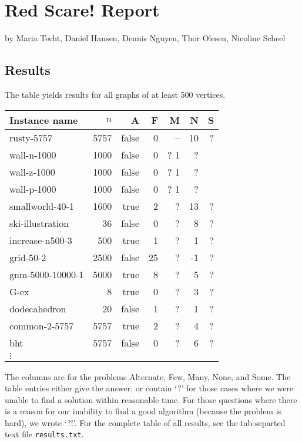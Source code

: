 \documentclass{tufte-handout}
\begin{document}
\section{Red Scare! Report}

by Maria Techt, Daniel Hansen, Dennis Nguyen, Thor Olesen, Nicoline Scheel

\subsection{Results}

The table yields results for all graphs of at least 500 vertices.

\medskip
\begin{tabular}{lrrrrrr}
  \toprule
  Instance name & $n$ & A & F & M & N & S \\
  \midrule
  rusty-5757 & 5757 & false & 0 & -- & 10 & ? \\
  wall-n-1000 & 1000 & false & 0 & ? 1 & ? \\	
  wall-z-1000 & 1000 & false & 0 & ? 1 & ? \\	
  wall-p-1000 & 1000 & false & 0 & ? 1 & ? \\	
  smallworld-40-1 & 1600 & true & 2 & ? & 13 & ?\\
  ski-illustration & 36 & false & 0 & ? & 8 & ?\\
  increase-n500-3 & 500 & true & 1 & ? & 1 & ?\\
  grid-50-2 & 2500 & false & 25 & ? & -1 & ?\\
  gnm-5000-10000-1 & 5000 & true & 8 & ? & 5 & ?\\
  G-ex & 8 & true & 0 & ? & 3 & ?\\
  dodecahedron & 20 & false & 1 & ? & 1 & ?\\
  common-2-5757 & 5757 & true & 2 & ? & 4 & ?\\
  bht & 5757 & false & 0 & ? & 6 & ?\\
  $\vdots$\\
  \bottomrule
\end{tabular}
\medskip

The columns are for the problems Alternate, Few, Many, None, and Some. The table entries either give the answer, or contain `?' for those cases where we were unable to find a solution within reasonable time. For those questions where there is a reason for our inability to find a good algorithm (because the problem is hard), we wrote `?!'. For the complete table of all results, see the tab-separted text file {\tt results.txt}.
\end{document}
